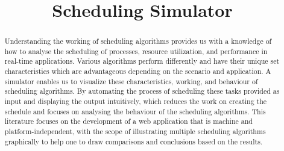 \documentclass[12pt, conference]{IEEEtran}
\begin{document}
\title{Scheduling Simulator}

\author{
\and
{}
}

\maketitle

\begin{abstract}
Understanding the working of scheduling algorithms provides us with a knowledge of how to analyse the scheduling of processes, resource utilization, and performance in real-time applications. Various algorithms perform differently and have their unique set characteristics which are advantageous depending on the scenario and application. A simulator enables us to visualize these characteristics, working, and behaviour of scheduling algorithms. By automating the process of scheduling these tasks provided as input and displaying the output intuitively, which reduces the work on creating the schedule and focuses on analysing the behaviour of the scheduling algorithms. This literature focuses on the development of a web application that is machine and platform-independent, with the scope of illustrating multiple scheduling algorithms graphically to help one to draw comparisons and conclusions based on the results.
\end{abstract}
\end{document}
